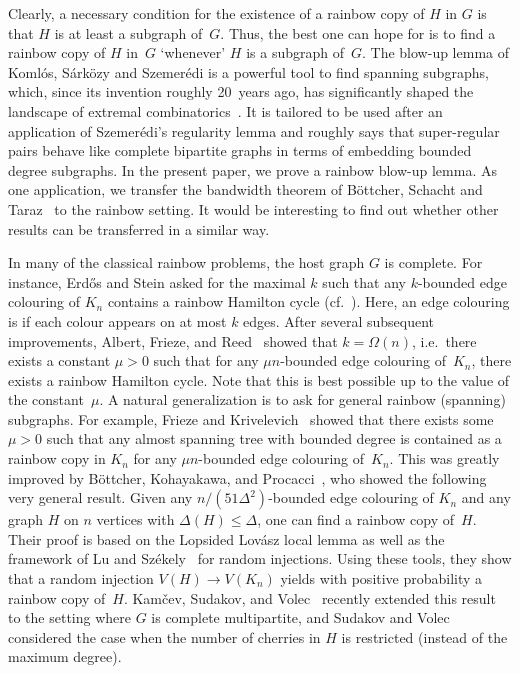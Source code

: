 \documentclass[10pt]{amsart}
\theoremstyle{definition}
\theoremstyle{claimstyle}
\theoremstyle{stepstyle}
\numberwithin{equation}{section}
\begin{document}
Clearly, a necessary condition for the existence of a rainbow copy of $H$ in $G$ is that $H$ is at least a subgraph of~$G$. 
Thus, the best one can hope for is to find a rainbow copy of $H$ in~$G$ `whenever' $H$ is a subgraph of~$G$.
The blow-up lemma of Koml\'os, S\'ark\"ozy and Szemer\'edi is a powerful tool to find spanning subgraphs, which, since its invention roughly 20~years ago, has significantly shaped the landscape of extremal combinatorics~\cite{BST:09,KSS:98,KSS:98a,KSS:01,KO:09,KO:13}.
It is tailored to be used after an application of Szemer\'edi's regularity lemma and roughly says that super-regular pairs behave like complete bipartite graphs in terms of embedding bounded degree subgraphs. 
In the present paper, we prove a rainbow blow-up lemma.
As one application, we transfer the bandwidth theorem of B\"ottcher, Schacht and Taraz~\cite{BST:09} to the rainbow setting. It would be interesting to find out whether other results can be transferred in a similar way.


In many of the classical rainbow problems, the host graph $G$ is complete.
For instance, Erd\H{o}s and Stein asked for the maximal $k$
such that any $k$-bounded edge colouring of $K_n$ contains a rainbow Hamilton cycle (cf.~\cite{ENR:83}). Here, an edge colouring is  if each colour appears on at most $k$ edges.
After several subsequent improvements, Albert, Frieze, and Reed~\cite{AFR:95} showed that $k=\Omega(n)$, i.e.~there exists a constant $\mu>0$ such that for any $\mu n$-bounded edge colouring of~$K_n$, there exists a rainbow Hamilton cycle. Note that this is best possible up to the value of the constant~$\mu$. 
A natural generalization is to ask for general rainbow (spanning) subgraphs. For example, Frieze and Krivelevich~\cite{FK:08} showed that there exists some $\mu>0$ such that any almost spanning tree with bounded degree is contained as a rainbow copy in $K_n$ for any $\mu n$-bounded edge colouring of~$K_n$.
This was greatly improved by B\"ottcher, Kohayakawa, and Procacci~\cite{BKP:12}, who showed the following very general result. Given any $n/(51\Delta^2)$-bounded edge colouring of $K_n$ and any graph $H$ on $n$ vertices with $\Delta(H)\le \Delta$, one can find a rainbow copy of~$H$.
Their proof is based on the Lopsided Lov\'asz local lemma as well as the framework of Lu and Sz\'ekely~\cite{LS:07} for random injections. Using these tools, they show that a random injection $V(H)\to V(K_n)$ yields with positive probability a rainbow copy of~$H$. Kam\v{c}ev, Sudakov, and Volec~\cite{KSV:17} recently extended this result 
to the setting where $G$ is complete multipartite, and Sudakov and Volec~\cite{SV:17} considered the case when the number of cherries in $H$ is restricted (instead of the maximum degree).
\end{document}
